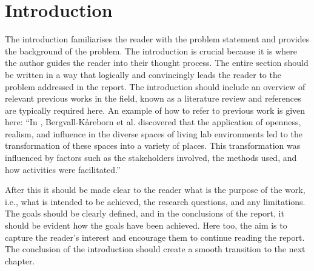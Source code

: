 \documentclass[a4paper]{article}
\begin{document}
\newpage
{} 
\setcounter{page}{1}

\section{Introduction}
The introduction familiarises the reader with the problem statement and provides the background of the problem. The introduction is crucial because it is where the author guides the reader into their thought process. The entire section should be written in a way that logically and convincingly leads the reader to the problem addressed in the report. The introduction should include an overview of relevant previous works in the field, known as a literature review and references are typically required here. An example of how to refer to previous work is given here: ``In \cite{BBK2015}, Bergvall-Kåreborn et al. discovered that the application of openness, realism, and influence in the diverse spaces of living lab environments led to the transformation of these spaces into a variety of places. This transformation was influenced by factors such as the stakeholders involved, the methods used, and how activities were facilitated.'' 

After this it should be made clear to the reader what is the purpose of the work, i.e., what is intended to be achieved, the research questions, and any limitations. The goals should be clearly defined, and in the conclusions of the report, it should be evident how the goals have been achieved. Here too, the aim is to capture the reader's interest and encourage them to continue reading the report. The conclusion of the introduction should create a smooth transition to the next chapter.

%
%

%
\end{document}

